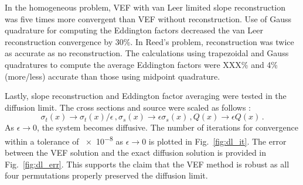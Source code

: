 In the homogeneous problem, VEF with van Leer limited slope reconstruction was five times more convergent  than VEF without reconstruction. Use of Gauss quadrature for computing the Eddington factors decreased the van Leer reconstruction convergence by 30\%. 
 In Reed's problem, reconstruction was twice as accurate as no reconstruction. The calculations 
using trapezoidal and Gauss quadratures to compute the average Eddington factors were XXX\% and 4\% (more/less) accurate than those using midpoint quadrature.  

Lastly, slope reconstruction and Eddington factor averaging were tested in the diffusion limit. The cross sections and source were scaled as follows \cite{diflim}: 
	\begin{subequations} \label{res:scaling}
		\begin{equation} 
			\sigma_t(x) \rightarrow \sigma_t(x)/\epsilon \,, 
		\end{equation}
		\begin{equation}
			\sigma_s(x) \rightarrow \epsilon \sigma_s(x) \,,
		\end{equation}
		\begin{equation}
			Q(x) \rightarrow \epsilon Q(x) \,. 
		\end{equation}
	\end{subequations}
As $\epsilon \rightarrow 0$, the system becomes diffusive. The number of iterations for convergence within a tolerance of \num{e-8} as $\epsilon \rightarrow 0$ is plotted in Fig.~\ref{fig:dl_it}. The error between the VEF solution and the exact diffusion solution is provided in Fig.~\ref{fig:dl_err}. This supports the claim that the VEF method is robust as all four permutations properly 
preserved the diffusion limit. 
	
